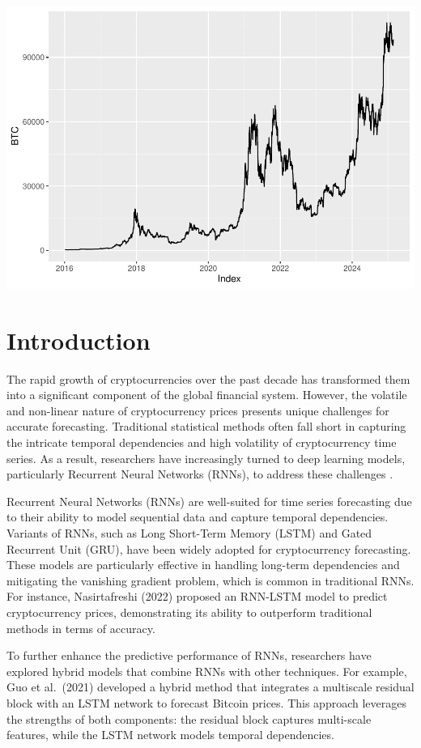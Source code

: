 \documentclass[]{interact}
\theoremstyle{plain}%
\theoremstyle{definition}
\theoremstyle{remark}
\begin{document}
\begin{center}\includegraphics[width=0.85\linewidth]{Colloque_files/figure-latex/unnamed-chunk-1-1} \end{center}

\section{Introduction}\label{introduction-1}

The rapid growth of cryptocurrencies over the past decade has
transformed them into a significant component of the global financial
system. However, the volatile and non-linear nature of cryptocurrency
prices presents unique challenges for accurate forecasting. Traditional
statistical methods often fall short in capturing the intricate temporal
dependencies and high volatility of cryptocurrency time series. As a
result, researchers have increasingly turned to deep learning models,
particularly Recurrent Neural Networks (RNNs), to address these
challenges \citep{NASIRTAFRESHI2022, kumar23, seable23} .

Recurrent Neural Networks (RNNs) are well-suited for time series
forecasting due to their ability to model sequential data and capture
temporal dependencies. Variants of RNNs, such as Long Short-Term Memory
(LSTM) and Gated Recurrent Unit (GRU), have been widely adopted for
cryptocurrency forecasting. These models are particularly effective in
handling long-term dependencies and mitigating the vanishing gradient
problem, which is common in traditional RNNs. For instance,
Nasirtafreshi (2022) proposed an RNN-LSTM model to predict
cryptocurrency prices, demonstrating its ability to outperform
traditional methods in terms of accuracy.

To further enhance the predictive performance of RNNs, researchers have
explored hybrid models that combine RNNs with other techniques. For
example, Guo et al.~(2021) developed a hybrid method that integrates a
multiscale residual block with an LSTM network to forecast Bitcoin
prices. This approach leverages the strengths of both components: the
residual block captures multi-scale features, while the LSTM network
models temporal dependencies.
\end{document}
